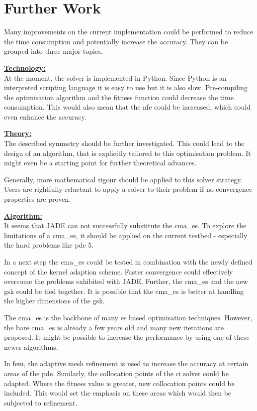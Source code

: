\documentclass[./\jobname.tex]{subfiles}
\begin{document}
\chapter{Further Work}

Many improvements on the current implementation could be performed to reduce the time consumption and potentially increase the accuracy. They can be grouped into three major topics.  

\underline{\textbf{Technology:}} \\
At the moment, the solver is implemented in Python. Since Python is an interpreted scripting language it is easy to use but it is also slow. Pre-compiling the optimisation algorithm and the fitness function could decrease the time consumption. This would also mean that the \gls{nfe} could be increased, which could even enhance the accuracy.

\underline{\textbf{Theory:}}\\
The described symmetry should be further investigated. This could lead to the design of an algorithm, that is explicitly tailored to this optimisation problem. It might even be a starting point for further theoretical advances.

Generally, more mathematical rigour should be applied to this solver strategy. Users are rightfully reluctant to apply a solver to their problem if no convergence properties are proven. 

\underline{\textbf{Algorithm:}}\\
It seems that JADE can not successfully substitute the \gls{cma_es}. To explore the limitations of a \gls{cma_es}, it should be applied on the current testbed - especially the hard problems like \gls{pde} 5. 

In a next step the \gls{cma_es} could be tested in combination with the newly defined concept of the kernel adaption scheme. Faster convergence could effectively overcome the problems exhibited with JADE. Further, the \gls{cma_es} and the new \gls{gsk} could be tied together. It is possible that the \gls{cma_es} is better at handling the higher dimensions of the \gls{gsk}. 

The \gls{cma_es} is the backbone of many \gls{es} based optimisation techniques. However, the bare \gls{cma_es} is already a few years old and many new iterations are proposed. It might be possible to increase the performance by using one of these newer algorithms. 

In \gls{fem}, the adaptive mesh refinement is used to increase the accuracy at certain areas of the \gls{pde}. Similarly, the collocation points of the \gls{ci} solver could be adapted. Where the fitness value is greater, new collocation points could be included. This would set the emphasis on these areas which would then be subjected to refinement. 
\end{document}
